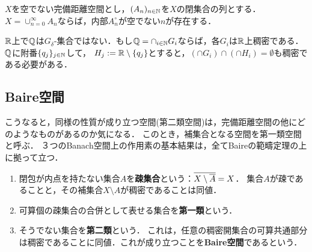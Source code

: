 \documentclass[uplatex,dvipdfmx]{jsreport}
\begin{document}
\begin{corollary}[AC]
    $X$を空でない完備距離空間とし，$(A_n)_{n\in\mathbb{N}}$を$X$の閉集合の列とする．$X=\cup_{n=0}^\infty A_n$ならば，内部$A^\circ_n$が空でない$n$が存在する．
\end{corollary}

\begin{example}
    $\mathbb{R}$上で$\mathbb{Q}$は$G_\delta$-集合ではない．もし$\mathbb{Q}=\cap_{i\in\mathbb{N}}G_i$ならば，各$G_i$は$\mathbb{R}$上稠密である．
    $\mathbb{Q}$に附番$\{q_j\}_{j\in\mathbb{N}}$して，
    $H_j:=\mathbb{R}\setminus\{q_j\}$とすると，$(\cap G_i)\cap(\cap H_i)=\emptyset$も稠密である必要がある．
\end{example}

\subsection{Baire空間}

\begin{tcolorbox}[colframe=ForestGreen, colback=ForestGreen!10!white,breakable,colbacktitle=ForestGreen!40!white,coltitle=black,fonttitle=\bfseries\sffamily,
    title=]
    こうなると，同様の性質が成り立つ空間(第二類空間)は，完備距離空間の他にどのようなものがあるのか気になる．
    このとき，補集合となる空間を第一類空間と呼ぶ．
    ３つのBanach空間上の作用素の基本結果は，全てBaireの範疇定理の上に拠って立つ．
\end{tcolorbox}

\begin{definition}\mbox{}
    \begin{enumerate}
        \item 閉包が内点を持たない集合$A$を\textbf{疎集合}という：$\overline{X\setminus\overline{A}}=X$．
        集合$A$が疎であることと，その補集合$X\setminus A$が稠密であることは同値．
        \item 可算個の疎集合の合併として表せる集合を\textbf{第一類}という．
        \item そうでない集合を\textbf{第二類}という．
        これは，任意の稠密開集合の可算共通部分は稠密であることに同値．これが成り立つことを\textbf{Baire空間}であるという．
    \end{enumerate}
\end{definition}
\end{document}
